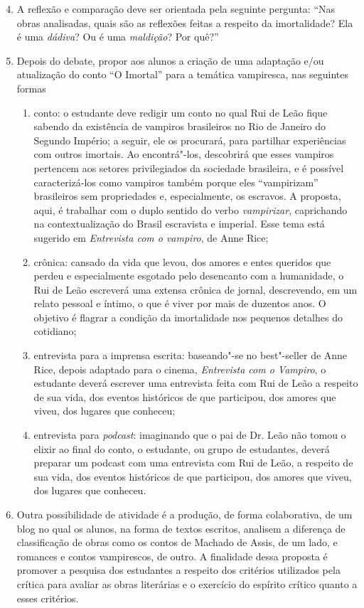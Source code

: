 \documentclass{extarticle}
\begin{document}
\begin{enumerate}\setcounter{enumi}{3}
\item A reflexão e comparação deve ser orientada pela seguinte pergunta:
``Nas obras analisadas, quais são as reflexões feitas a respeito da
imortalidade? Ela é uma \emph{dádiva}? Ou é uma \emph{maldição}? Por
quê?''

\item Depois do debate, propor aos alunos a criação de uma adaptação e/ou
atualização do conto ``O Imortal'' para a temática vampiresca, nas
seguintes formas

\begin{enumerate}
\item conto: o estudante deve redigir um conto no qual Rui de Leão fique
sabendo da existência de vampiros brasileiros no Rio de Janeiro do
Segundo Império; a seguir, ele os procurará, para partilhar experiências
com outros imortais. Ao encontrá"-los, descobrirá que esses vampiros
pertencem aos setores privilegiados da sociedade brasileira, e é
possível caracterizá-los como vampiros também porque eles ``vampirizam''
brasileiros sem propriedades e, especialmente, os escravos. A proposta,
aqui, é trabalhar com o duplo sentido do verbo \emph{vampirizar},
caprichando na contextualização do Brasil escravista e imperial. Esse
tema está sugerido em \emph{Entrevista com o vampiro}, de Anne Rice;

\item crônica: cansado da vida que levou, dos amores e entes queridos que
perdeu e especialmente esgotado pelo desencanto com a humanidade, o Rui
de Leão escreverá uma extensa crônica de jornal, descrevendo, em um
relato pessoal e íntimo, o que é viver por mais de duzentos anos. O
objetivo é flagrar a condição da imortalidade nos pequenos detalhes do
cotidiano;

\item entrevista para a imprensa escrita: baseando"-se no best"-seller de
Anne Rice, depois adaptado para o cinema, \emph{Entrevista com o
Vampiro}, o estudante deverá escrever uma entrevista feita com Rui de
Leão a respeito de sua vida, dos eventos históricos de que participou,
dos amores que viveu, dos lugares que conheceu;

\item entrevista para \textit{podcast}: imaginando que o pai de Dr. Leão não tomou o
elixir ao final do conto, o estudante, ou grupo de estudantes, deverá
preparar um podcast com uma entrevista com Rui de Leão, a respeito de
sua vida, dos eventos históricos de que participou, dos amores que
viveu, dos lugares que conheceu.
\end{enumerate}

\item Outra possibilidade de atividade é a produção, de forma colaborativa,
de um blog no qual os alunos, na forma de textos escritos, analisem a
diferença de classificação de obras como os contos de Machado de Assis,
de um lado, e romances e contos vampirescos, de outro. A finalidade
dessa proposta é promover a pesquisa dos estudantes a respeito dos
critérios utilizados pela crítica para avaliar as obras literárias e o
exercício do espírito crítico quanto a esses critérios.
\end{enumerate}
\end{document}
